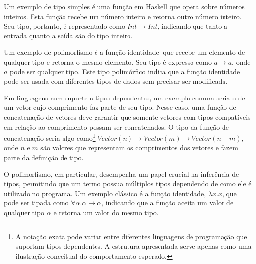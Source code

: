 Um exemplo de tipo simples é uma função em Haskell que opera sobre números inteiros.
Esta função recebe um número inteiro e retorna outro número inteiro.
Seu tipo, portanto, é representado como $Int \rightarrow Int$, indicando que tanto a entrada quanto a saída são do tipo inteiro.

Um exemplo de polimorfismo é a função identidade, que recebe um elemento de qualquer tipo e retorna o mesmo elemento.
Seu tipo é expresso como $a \rightarrow a$, onde $a$ pode ser qualquer tipo.
Este tipo polimórfico indica que a função identidade pode ser usada com diferentes tipos de dados sem precisar ser modificada.

Em linguagens com suporte a tipos dependentes, um exemplo comum seria o de um vetor cujo comprimento faz parte de seu tipo.
Nesse caso, uma função de concatenação de vetores deve garantir que somente vetores com tipos compatíveis em relação ao comprimento possam ser concatenados.
O tipo da função de concatenação seria algo como\footnote{A notação exata pode variar entre diferentes linguagens de programação que suportam tipos dependentes. A estrutura apresentada serve apenas como uma ilustração conceitual do comportamento esperado.} $Vector(n) \rightarrow Vector(m) \rightarrow Vector(n+m)$, onde $n$ e $m$ são valores que representam os comprimentos dos vetores e fazem parte da definição de tipo.

O polimorfismo, em particular, desempenha um papel crucial na inferência de tipos, permitindo que um termo possua múltiplos tipos dependendo de como ele é utilizado no programa.
Um exemplo clássico é a função identidade, $\lambda x.x$, que pode ser tipada como $\forall \alpha. \alpha \to \alpha$, indicando que a função aceita um valor de qualquer tipo $\alpha$ e retorna um valor do mesmo tipo.


